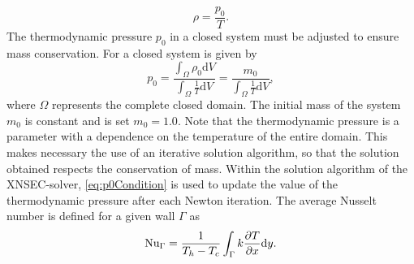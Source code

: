 \begin{equation}
	\rho = \frac{p_0}{T}.
\end{equation}
The thermodynamic pressure $p_0$ in a closed system must be adjusted to ensure mass conservation. For a closed system is given by
\begin{equation}
	p_0 =\frac{\int_\Omega \rho_0\text{d}V}{\int_\Omega \frac{1}{T}\text{d}V}= \frac{m_0}{\int_\Omega \frac{1}{T}\text{d}V}, \label{eq:p0Condition}
\end{equation}
where $\Omega$ represents the complete closed domain. The initial mass of the system $m_0$ is constant and is set $m_0 = 1.0$. Note that the thermodynamic pressure is a parameter with a dependence on the temperature of the entire domain. This makes necessary the use of an iterative solution algorithm, so that the solution obtained respects the conservation of mass. Within the solution algorithm of the XNSEC-solver, \cref{eq:p0Condition} is used to update the value of the thermodynamic pressure after each Newton iteration.
The average Nusselt number is defined for a given wall $\Gamma$  as
\begin{equation}\label{eq:Nusselt}
	\text{Nu}_\Gamma = \frac{1}{T_h - T_c}\int_{\Gamma} k \frac{\partial T}{\partial x}\text{d}y.
\end{equation}

